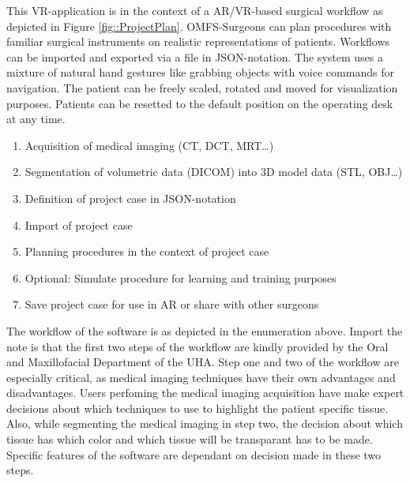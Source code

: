 This VR-application is in the context of a AR/VR-based surgical workflow as depicted in Figure \ref{fig::ProjectPlan}.
OMFS-Surgeons can plan procedures with familiar surgical instruments on realistic representations of patients.
Workflows can be imported and exported via a file in JSON-notation.
The system uses a mixture of natural hand gestures like grabbing objects with voice commands for navigation.
The patient can be freely scaled, rotated and moved for visualization purposes.
Patients can be resetted to the default position on the operating desk at any time.

\begin{enumerate}
    \item Acquisition of medical imaging (CT, DCT, MRT\ldots)
    \item Segmentation of volumetric data (DICOM) into 3D model data (STL, OBJ\ldots)
    \item Definition of project case in JSON-notation
    \item Import of project case
    \item Planning procedures in the context of project case
    \item Optional: Simulate procedure for learning and training purposes
    \item Save project case for use in AR or share with other surgeons
\end{enumerate}

The workflow of the software is as depicted in the enumeration above.
Import the note is that the first two steps of the workflow are kindly provided by the Oral and Maxillofacial Department of the UHA.
Step one and two of the workflow are especially critical, as medical imaging techniques have their own advantages and disadvantages.
Users perfoming the medical imaging acquisition have make expert decisions about which techniques to use to highlight the patient specific tissue.
Also, while segmenting the medical imaging in step two, the decision about which tissue has which color and which tissue will be transparant has to be made.
Specific features of the software are dependant on decision made in these two steps.



